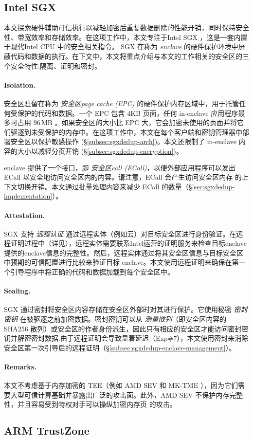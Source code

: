 \subsection{Intel SGX}
\label{subsec:background-tee-sgx}

本文探索硬件辅助可信执行以减轻加密后重复数据删除的性能开销，同时保持安全性、带宽效率和存储效率。在这项工作中，本文专注于Intel SGX \cite{sgx}，这是一套内置于现代Intel CPU 中的安全相关指令。 SGX 在称为 \textit{ enclave} 的硬件保护环境中屏蔽代码和数据的执行。在下文中，本文将重点介绍与本文的工作相关的安全区的三个安全特性:隔离、证明和密封。

\paragraph*{Isolation.}安全区驻留在称为 \textit{安全区page cache (EPC)} 的硬件保护内存区域中，用于托管任何受保护的代码和数据。一个 EPC 包含 4KB 页面，任何 in-enclave 应用程序最多可占用 96\,MB \cite{harnik18}。如果安全区的大小比 EPC 大，它会加密未使用的页面并将它们驱逐到未受保护的内存中。在这项工作中，本文在每个客户端和密钥管理器中部署安全区以保护敏感操作 (\S\ref{subsec:sgxdedup-arch})。本文还限制了 in-enclave 内容的大小以减轻分页开销 (\S\ref{subsec:sgxdedup-encryption})。

enclave 提供了一个接口，即 \textit{安全区call (ECall)}，以便外部应用程序可以发出 ECall 以安全地访问安全区内的内容。请注意，ECall 会产生访问安全区内存 \cite{harnik18} 的上下文切换开销。本文通过批量处理内容来减少 ECall 的数量（\S\ref{sec:sgxdedup-implementation}）。

\paragraph*{Attestation.} SGX 支持 \textit{ 远程认证} 通过远程实体（例如云）对目标安全区进行身份验证。在远程证明过程中（详见\cite{sgx}），远程实体需要联系Intel运营的证明服务来检查目标enclave提供的enclave信息的完整性。然后，远程实体通过将其安全区信息与目标安全区中预期的可信配置进行比较来验证目标 enclave。本文使用远程证明来确保在第一个引导程序中将正确的代码和数据加载到每个安全区中。

\paragraph*{Sealing.} SGX 通过密封将安全区内容存储在安全区外部时对其进行保护。它使用秘密 \textit{ 密封密钥} 在被驱逐之前加密数据。密封密钥可以从 \textit{ 测量散列}（即安全区内容的 SHA256 散列）或安全区的作者身份派生，因此只有相应的安全区才能访问密封密钥并解密密封数据.由于远程证明会导致显着延迟（Exp\#7），本文使用密封来消除安全区第一次引导后的远程证明（\S\ref{subsec:sgxdedup-enclave-management}）。

\paragraph*{Remarks.} 本文不考虑基于内存加密的 TEE（例如 AMD SEV \cite{AMDSEV} 和 MK-TME \cite{Mktem}），因为它们需要大型可信计算基础并暴露出广泛的攻击面\cite{mofrad18}。此外，AMD SEV \cite{AMDSEV} 不保护内存完整性，并且容易受到特权对手可以操纵加密内存页 \cite{mofrad18} 的攻击。


\subsection{ARM TrustZone}
\label{subsec:background-tee-tz}
